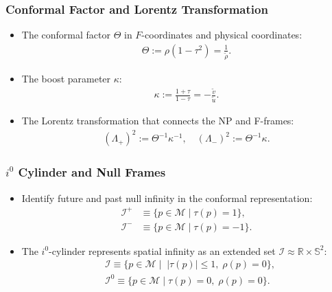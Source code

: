 \documentclass{beamer}
\theoremstyle{remark}
\theoremstyle{plain}
\theoremstyle{plain}
\begin{document}
\begin{frame}
  \frametitle{Conformal Factor and Lorentz Transformation}
  \begin{itemize}
    \item The conformal factor $\Theta$ in $F$-coordinates and physical coordinates:
    \begin{align}
      \Theta := \rho (1-\tau^2) = \frac{1}{\tilde{\rho}}.
    \end{align}
    \item The boost parameter $\kappa$:
    \begin{align}
      \kappa := \frac{1+\tau}{1-\tau} = -\frac{\tilde{v}}{\tilde{u}}.
    \end{align}
    \item The Lorentz transformation that connects the NP and F-frames:
    \begin{align}
      (\Lambda_{+})^{2} := \Theta^{-1}\kappa^{-1}, \quad (\Lambda_{-})^{2} := \Theta^{-1}\kappa.
    \end{align}
  \end{itemize}
\end{frame}

\begin{frame}
  \frametitle{$i^0$ Cylinder and Null Frames}
  \begin{itemize}
    \item Identify future and past null infinity in the conformal representation:
    \begin{align*}
      \mathscr{I}^{+} & \equiv \{ p \in \mathcal{M} \; \rvert\; \tau(p) =1\}, \\
      \mathscr{I}^{-} & \equiv \{ p \in \mathcal{M} \; \rvert \;\tau(p) =-1\}.
    \end{align*}
    \item The $i^0$-cylinder represents spatial infinity as an extended set $\mathcal{I} \approx \mathbb{R}\times \mathbb{S}^2$:
    \begin{align}
      & \mathcal{I} \equiv \{ p \in \mathcal{M} \; \rvert \;\; |\tau(p)| \leq 1, \;\rho(p)=0\}, \\
      & \mathcal{I}^{0} \equiv \{ p \in \mathcal{M}\; \rvert \;\tau(p)=0, \; \rho(p)=0\}.
    \end{align}
  \end{itemize}
\end{frame}
\end{document}
